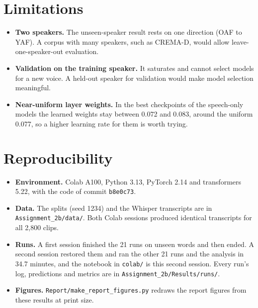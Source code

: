 \documentclass[11pt,a4paper]{article}
\newcommand{\code}[1]{\texttt{#1}}
\begin{document}
\section{Limitations}
\begin{itemize}
\item \textbf{Two speakers.} The unseen-speaker result rests on one direction (OAF to YAF). A corpus with many speakers,
  such as CREMA-D, would allow leave-one-speaker-out evaluation.
\item \textbf{Validation on the training speaker.} It saturates and cannot select models for a new voice. A held-out
  speaker for validation would make model selection meaningful.
\item \textbf{Near-uniform layer weights.} In the best checkpoints of the speech-only models the learned weights stay between
  0.072 and 0.083, around the uniform 0.077, so a higher learning rate for them is worth trying.
\end{itemize}

\section{Reproducibility}
\begin{itemize}
\item \textbf{Environment.} Colab A100, Python 3.13, PyTorch 2.14 and transformers 5.22, with the code of commit
  \code{b8e0c73}.
\item \textbf{Data.} The splits (seed 1234) and the Whisper transcripts are in \code{Assignment\_2b/data/}. Both Colab
  sessions produced identical transcripts for all 2{,}800 clips.
\item \textbf{Runs.} A first session finished the 21 runs on unseen words and then ended. A second session restored them
  and ran the other 21 runs and the analysis in 34.7 minutes, and the notebook in \code{colab/} is this second session.
  Every run's log, predictions and metrics are in \code{Assignment\_2b/Results/runs/}.
\item \textbf{Figures.} \code{Report/make\_report\_figures.py} redraws the report figures from these results at print
  size.
\end{itemize}
\end{document}
